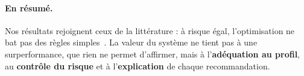\paragraph{En résumé.} Nos résultats rejoignent ceux de la littérature : à risque égal, l'optimisation ne bat pas des règles simples~\cite{demiguel2009}. La valeur du système ne tient pas à une surperformance, que rien ne permet d'affirmer, mais à l'\textbf{adéquation au profil}, au \textbf{contrôle du risque} et à l'\textbf{explication} de chaque recommandation.
